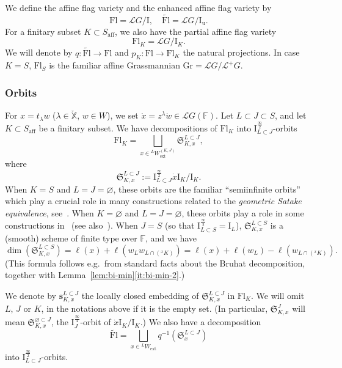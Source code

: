 \documentclass[11pt]{amsart}
\numberwithin{equation}{section}
\theoremstyle{plain}
\theoremstyle{definition}
\newcommand{\F}{{\mathbb F}}
\newcommand{\I}{{\mathrm I}}
\newcommand{\sL}{{\mathcal L}}
\newcommand{\rQ}{{\mathrm Q}}
\newcommand{\X}{{\mathbb X}}
\newcommand{\Xd}{\check{\X}}
\newcommand{\semi}{{{\frac{\infty}{2}}}}
\newcommand{\quar}{{{\frac{\infty}{4}}}}
\newcommand{\ex}{\mathrm{ext}}
\newcommand{\af}{\mathrm{aff}}
\newcommand{\Fl}{\mathrm{Fl}}
\newcommand{\Gr}{\mathrm{Gr}}
\newcommand{\tFl}{\widetilde{\Fl}}
\newcommand{\bs}{\mathbf{s}}
\newcommand{\Iu}{\mathrm{I}_{\mathrm{u}}}
\newcommand{\rS}{\mathfrak{S}}
\begin{document}
We define the affine flag variety and the enhanced affine flag variety  by 
\[
\Fl=\sL G/\I, \quad \tFl=\sL G/\Iu.
\]
For a finitary subset $K\subset S_\af$, we also have the partial affine flag variety
\[
\Fl_K=\sL G/\I_K. 
\]
We will denote by $q:\tFl\rightarrow \Fl$ and $p_K: \Fl\rightarrow \Fl_K$ the natural projections. In case $K=S$, $\Fl_S$ is the familiar affine Grassmannian $\Gr = \sL G / \sL^+ G$.

\subsubsection{Orbits} 

For $x=t_\lambda w$ ($\lambda\in \Xd$, $w\in W$), we set $\dot{x}=z^\lambda \dot{w}\in \sL{G}(\F)$. 
Let $L \subset J \subset S$, and let $K \subset S_\af$ be a finitary subset.
We have decompositions of $\Fl_K$ into $\I_{L \subset J}^\semi$-orbits
\begin{equation}
\label{eq:decomp}
\Fl_K= \bigsqcup_{x\in {}^L W_\ex^{(K,J)}} \rS^{L \subset J}_{K,x},
\end{equation}
where 
\[
\rS^{L \subset J}_{K,x}:= \I_{L \subset J}^{\semi} \dot{x} \I_K/\I_K.
\]
When $K=S$ and $L=J=\varnothing$, these orbits are the familiar ``semiinfinite orbits'' which play a crucial role in many constructions related to the \emph{geometric Satake equivalence}, see~\cite{mv}. When $K=\varnothing$ and $L=J=\varnothing$, these orbits play a role in some constructions in~\cite{ab} (see also~\cite[\S 4.5]{ARbook}).
When $J=S$ (so that $\I_{L \subset S}^\semi = \I_L$),
$\rS^{L \subset S}_{K,x}$ is a (smooth) scheme of finite type over $\F$, and we have
\begin{equation}
\label{eqn:dim-par-orbit}
\dim(\rS^{L \subset S}_{K,x}) = \ell(x) + \ell(w_L w_{L \cap ({}^xK)}) = \ell(x) + \ell(w_L) -\ell(w_{L \cap ({}^xK)}).
\end{equation}
(This formula follows e.g.~from standard facts about the Bruhat decomposition, together with Lemma~\ref{lem:bi-min}\eqref{it:bi-min-2}.)

We denote by $\bs^{L \subset J}_{K,x}$ the locally closed embedding of $\rS^{L \subset J}_{K,x}$ in $\Fl_K$. 
We will omit $L$, $J$ or $K$, in the notations above if it is the empty set. (In particular, $\rS^J_{K,x}$ will mean $\rS^{\varnothing \subset J}_{K,x}$, the $\I_J^\quar$-orbit of $\dot{x} \I_K/\I_K$.)
We also have a decomposition 
\begin{equation*}
\tFl = \bigsqcup_{x\in {}^L W_\ex} q^{-1}(\rS^{L \subset J}_x)
\end{equation*}
into $\I_{L \subset J}^{\semi}$-orbits.
\end{document}
